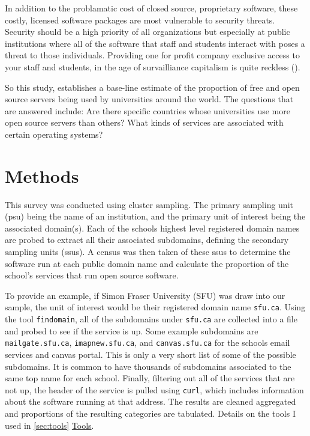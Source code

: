 \documentclass{article}
\theoremstyle{definition}
\begin{document}
\begin{flushleft}
\begin{multicols}{2}
In addition to the problamatic cost of closed source, proprietary
software, these costly, licensed software packages are most vulnerable
to security threats.
Security should be a high priority of all organizations but
especially at public institutions where all of the software that staff and
students interact with poses a threat to those individuals.
Providing one for profit company exclusive access to your staff and
students, in the age of survailliance capitalism is quite reckless
(\cite{karen2018}).

So this study, establishes a base-line estimate
of the proportion of free and open source servers being used by
universities around the world.
The questions that are answered include:
Are there specific countries whose universities
use more open source servers than others? What kinds of services
are associated with certain operating systems?

\section{Methods}
This survey was conducted using cluster sampling.
The primary sampling unit (psu) being the name
of an institution, and the primary unit of interest
being the associated domain(s). Each of the schools
highest level registered domain names are probed to
extract all their associated subdomains, defining the secondary
sampling units (ssus).
A census was then taken of these ssus
to determine the software run at each public domain name and
calculate the proportion of the school's services that
run open source software.

To provide an example, if Simon Fraser University (SFU)
was draw into our sample, the unit of interest would be
their registered domain name \texttt{sfu.ca}. Using the
tool \texttt{findomain}, all of the subdomains under
\texttt{sfu.ca} are collected into a file and probed to see if the service is up.
Some example subdomains are \texttt{mailgate.sfu.ca},
\texttt{imapnew.sfu.ca}, and \texttt{canvas.sfu.ca} for
the schools email services and canvas portal. This is
only a very short list of some of the possible subdomains.
It is common to have thousands of subdomains associated
to the same top name for each school. Finally, filtering out all of
the services that are not up, the header of the service is pulled
using \texttt{curl}, which includes information about the software
running at that address. The results are cleaned aggregated and proportions
of the resulting categories are tabulated.
Details on the tools I used in \autoref{sec:tools} \hyperref[sec:tools]{Tools}.


\end{multicols}
\end{flushleft}
\end{document}
